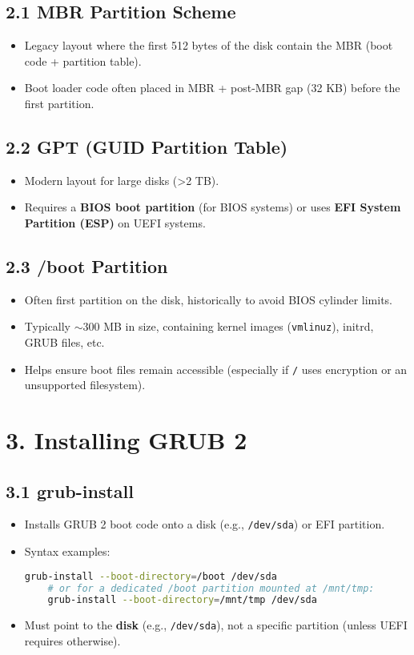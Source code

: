 \documentclass[12pt,a4paper]{report}
\begin{document}
\subsection*{2.1 MBR Partition Scheme}
\begin{itemize}
    \item Legacy layout where the first 512 bytes of the disk contain the MBR (boot code + partition table).  
    \item Boot loader code often placed in MBR + post-MBR gap (32 KB) before the first partition.
\end{itemize}

\subsection*{2.2 GPT (GUID Partition Table)}
\begin{itemize}
    \item Modern layout for large disks (>2 TB).  
    \item Requires a \textbf{BIOS boot partition} (for BIOS systems) or uses \textbf{EFI System Partition (ESP)} on UEFI systems.
\end{itemize}

\subsection*{2.3 /boot Partition}
\begin{itemize}
    \item Often first partition on the disk, historically to avoid BIOS cylinder limits.  
    \item Typically $\sim$300 MB in size, containing kernel images (\texttt{vmlinuz}), initrd, GRUB files, etc.  
    \item Helps ensure boot files remain accessible (especially if \texttt{/} uses encryption or an unsupported filesystem).
\end{itemize}



\section*{3. Installing GRUB 2}

\subsection*{3.1 grub-install}
\begin{itemize}
    \item Installs GRUB 2 boot code onto a disk (e.g., \texttt{/dev/sda}) or EFI partition.  
    \item Syntax examples:  
    \begin{lstlisting}[language=bash]
    grub-install --boot-directory=/boot /dev/sda
    # or for a dedicated /boot partition mounted at /mnt/tmp:
    grub-install --boot-directory=/mnt/tmp /dev/sda
    \end{lstlisting}
    \item Must point to the \textbf{disk} (e.g., \texttt{/dev/sda}), not a specific partition (unless UEFI requires otherwise).
\end{itemize}
\end{document}
